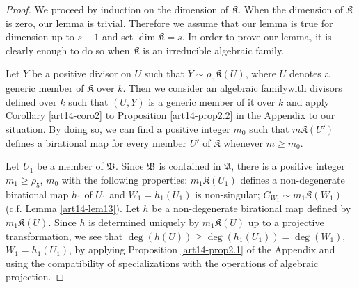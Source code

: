\begin{proof}
We proceed by induction on the dimension of $\mathfrak{K}$. When the dimension of $\mathfrak{K}$ is zero, our lemma is trivial. Therefore we assume that our lemma is true for dimension up to $s-1$ and set $\dim \mathfrak{K}=s$. In order to prove our lemma, it is clearly enough to do so when $\mathfrak{K}$ is an irreducible algebraic family.

Let $Y$ be a positive divisor on $U$ such that $Y\sim \rho_{5}\mathfrak{K}(U)$, where $U$ denotes a generic member of $\mathfrak{K}$ over $k$. Then we consider an algebraic family\pageoriginale with divisors defined over $\overline{k}$ such that $(U,Y)$ is a generic member of it over $\overline{k}$ and apply Corollary \ref{art14-coro2} to Proposition \ref{art14-prop2.2} in the Appendix to our situation. By doing so, we can find a positive integer $m_{0}$ such that $m\mathfrak{K}(U')$ defines a birational map for every member $U'$ of $\mathfrak{K}$ whenever $m\geq m_{0}$.

Let $U_{1}$ be a member of $\mathfrak{B}$. Since $\mathfrak{B}$ is contained in $\mathfrak{A}$, there is a positive integer $m_{1}\geq \rho_{5}$, $m_{0}$ with the following properties: $m_{1}\mathfrak{K}(U_{1})$ defines a non-degenerate birational map $h_{1}$ of $U_{1}$ and $W_{1}=h_{1}(U_{1})$ is non-singular; $C_{W_{1}}\sim m_{1}\mathfrak{K}(W_{1})$ (c.f. Lemma \ref{art14-lem13}). Let $h$ be a non-degenerate birational map defined by $m_{1}\mathfrak{K}(U)$. Since $h$ is determined uniquely by $m_{1}\mathfrak{K}(U)$ up to a projective transformation, we see that $\deg(h(U))\geq \deg(h_{1}(U_{1}))=\deg (W_{1})$, $W_{1}=h_{1}(U_{1})$, by applying Proposition \ref{art14-prop2.1} of the Appendix and using the compatibility of specializations with the operations of algebraic projection.


\end{proof}
